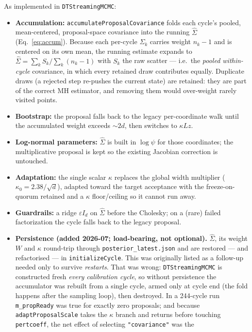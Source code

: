 \documentclass[11pt]{article}
\newcommand{\code}[1]{\texttt{\small #1}}
\newcommand{\pc}{\code{pertcoeff}}
\begin{document}
As implemented in \code{DTStreamingMCMC}:
\begin{itemize}[leftmargin=1.4em,nosep]
  \item \textbf{Accumulation:} \code{accumulateProposalCovariance} folds
  each cycle's pooled, mean-centered, proposal-space covariance into the
  running $\hat\Sigma$ (Eq.~\ref{eq:accum}). Because each per-cycle
  $\Sigma_k$ carries weight $n_k-1$ and is centered on its own mean, the
  running estimate expands to $\hat\Sigma = \sum_k S_k / \sum_k (n_k-1)$
  with $S_k$ the raw scatter --- i.e.\ the \emph{pooled within-cycle}
  covariance, in which every retained draw contributes equally. Duplicate
  draws (a rejected step re-pushes the current state) are retained: they are
  part of the correct MH estimator, and removing them would over-weight
  rarely visited points.
  \item \textbf{Bootstrap:} the proposal falls back to the legacy
  per-coordinate walk until the accumulated weight exceeds $\sim\!2d$, then
  switches to $\kappa L z$.
  \item \textbf{Log-normal parameters:} $\hat\Sigma$ is built in $\log\psi$
  for those coordinates; the multiplicative proposal is kept so the existing
  Jacobian correction is untouched.
  \item \textbf{Adaptation:} the single scalar $\kappa$ replaces the global
  width multiplier ($\kappa_0=2.38/\sqrt d$), adapted toward the target
  acceptance with the freeze-on-quorum retained and a $\kappa$
  floor/ceiling so it cannot run away.
  \item \textbf{Guardrails:} a ridge $\varepsilon I_d$ on $\hat\Sigma$ before
  the Cholesky; on a (rare) failed factorization the cycle falls back to the
  legacy proposal.
  \item \textbf{Persistence (added 2026-07; load-bearing, not optional).}
  $\hat\Sigma$, its weight $W$ and $\kappa$ round-trip through
  \code{posterior\_latest.json} and are restored --- and refactorised --- in
  \code{initializeCycle}. This was originally listed as a follow-up needed
  only to survive \emph{restarts}. That was wrong: \code{DTStreamingMCMC} is
  constructed fresh \emph{every calibration cycle}, so without persistence
  the accumulator was rebuilt from a single cycle, armed only at cycle end
  (the fold happens after the sampling loop), then destroyed. In a 244-cycle
  run \code{m\_propReady} was true for exactly zero proposals; and because
  \code{adaptProposalScale} takes the $\kappa$ branch and returns before
  touching \pc, the net effect of selecting \code{"covariance"} was the

\end{itemize}
\end{document}
